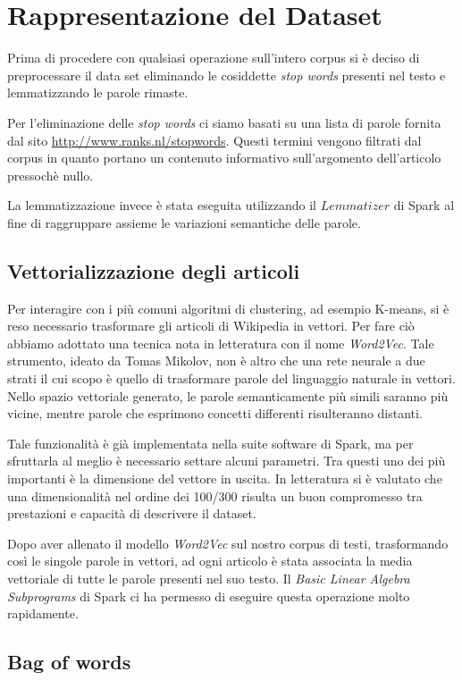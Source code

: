 \documentclass[
	11pt, %
	a4paper, %
	oneside, %
	headinclude,footinclude, %
	BCOR5mm, %
]{scrartcl}
\begin{document}
\section{Rappresentazione del Dataset}
	Prima di procedere con qualsiasi operazione sull'intero corpus si è deciso di preprocessare il data set eliminando le cosiddette \emph{stop words} presenti nel testo e lemmatizzando le parole rimaste.

	Per l'eliminazione delle \emph{stop words} ci siamo basati su una lista di parole fornita dal sito \url{http://www.ranks.nl/stopwords}.
	Questi termini vengono filtrati dal corpus in quanto portano un contenuto informativo sull'argomento dell'articolo pressochè nullo.

	La lemmatizzazione invece è stata eseguita utilizzando il $Lemmatizer$ di Spark al fine di raggruppare assieme le variazioni semantiche delle parole.

	\subsection{Vettorializzazione degli articoli}
		Per interagire con i più comuni algoritmi di clustering, ad esempio K-means, si è reso necessario trasformare gli articoli di Wikipedia in vettori.
		Per fare ciò abbiamo adottato una tecnica nota in letteratura con il nome \emph{Word2Vec}. Tale strumento, ideato da Tomas Mikolov, non è altro che una rete neurale a due strati il cui scopo è quello di trasformare parole del linguaggio naturale in vettori. Nello spazio vettoriale generato, le parole semanticamente più simili saranno più vicine, mentre parole che esprimono concetti differenti risulteranno distanti.

		Tale funzionalità è già implementata nella suite software di Spark, ma per sfruttarla al meglio è necessario settare alcuni parametri. Tra questi uno dei più importanti è la dimensione del vettore in uscita.
		In letteratura si è valutato che una dimensionalità nel ordine dei 100/300\cite{w2vdim} risulta un buon compromesso tra prestazioni e capacità di descrivere il dataset.

		Dopo aver allenato il modello \emph{Word2Vec} sul nostro corpus di testi, trasformando così le singole parole in vettori, ad ogni articolo è stata associata la media vettoriale di tutte le parole presenti nel suo testo. Il \emph{Basic Linear Algebra Subprograms} di Spark ci ha permesso di eseguire questa operazione molto rapidamente.

	\subsection{Bag of words} \label{sec:bag_of_words}
\end{document}

